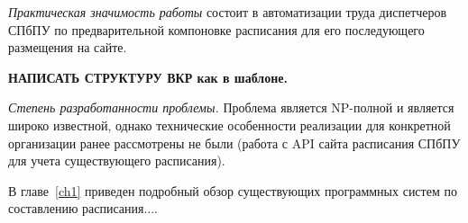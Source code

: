 
\textit{Практическая значимость работы} состоит в автоматизации труда диспетчеров СПбПУ по предварительной компоновке расписания для его последующего размещения на сайте.

\textbf{НАПИСАТЬ СТРУКТУРУ ВКР как в шаблоне.}

\textit{Степень разработанности проблемы.} Проблема является NP-полной и является широко известной, однако технические особенности реализации для конкретной организации ранее рассмотрены не были (работа с API сайта расписания СПбПУ для учета существующего расписания).


В главе~\ref{ch1} приведен подробный обзор существующих программных систем по составлению расписания....

